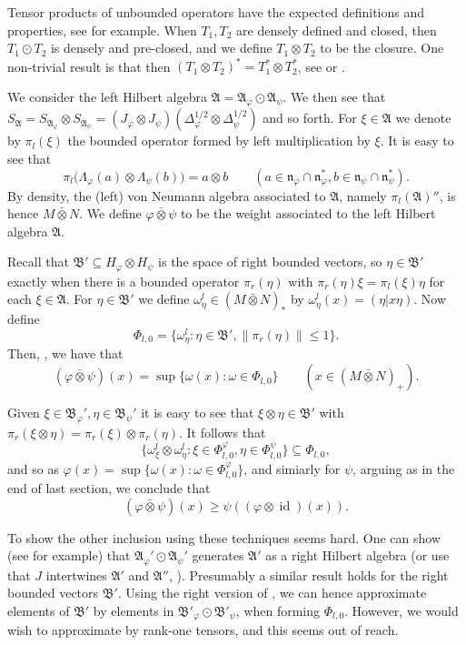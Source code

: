 \documentclass[a4paper,11pt]{article}
\theoremstyle{plain}
\theoremstyle{remark}
\newcommand{\mf}[1]{\mathfrak{#1}}
\newcommand{\id}{\operatorname{id}}
\newcommand{\vnten}{\bar\otimes}
\begin{document}
Tensor products of unbounded operators have the expected definitions and properties, see \cite[Section~7.5]{Schmudgen_UnboundedBook} for example.  When $T_1,T_2$ are densely defined and closed, then $T_1\odot T_2$ is densely and pre-closed, and we define $T_1\otimes T_2$ to be the closure.  One non-trivial result is that then $(T_1\otimes T_2)^* = T_1^*\otimes T_2^*$, see \cite[Proposition~7.26]{Schmudgen_UnboundedBook} or \cite[Lemma~VIII.4.1]{TakesakiII}.

We consider the left Hilbert algebra $\mf A = \mf A_\varphi \odot \mf A_\psi$.  We then see that $S_{\mf A} = S_{\mf A_\varphi} \otimes S_{\mf A_\psi} = (J_\varphi\otimes J_\psi) (\Delta_\varphi^{1/2} \otimes \Delta_\psi^{1/2})$ and so forth.  For $\xi\in\mf A$ we denote by $\pi_l(\xi)$ the bounded operator formed by left multiplication by $\xi$.  It is easy to see that
\[ \pi_l\big( \Lambda_\varphi(a) \otimes \Lambda_\psi(b) \big) = a\otimes b \qquad
(a\in\mf n_\varphi \cap \mf n_\varphi^*, b\in\mf n_\psi \cap \mf n_\psi^*). \]
By density, the (left) von Neumann algebra associated to $\mf A$, namely $\pi_l(\mf A)''$, is hence $M\vnten N$.  We define $\varphi\vnten\psi$ to be the weight associated to the left Hilbert algebra $\mf A$.

Recall that $\mf B' \subseteq H_\varphi \otimes H_\psi$ is the space of right bounded vectors, so $\eta\in\mf B'$ exactly when there is a bounded operator $\pi_r(\eta)$ with $\pi_r(\eta)\xi = \pi_l(\xi)\eta$ for each $\xi\in \mf A$.  For $\eta\in\mf B'$ we define $\omega^l_\eta \in (M\vnten N)_*$ by $\omega^l_\eta(x) = (\eta|x\eta)$.  Now define
\[ \Phi_{l,0} = \big\{ \omega^l_\eta : \eta\in\mf B', \|\pi_r(\eta)\|\leq 1 \big\}. \]
Then, \cite[Lemma~VII.2.4]{TakesakiII}, we have that
\[ (\varphi\vnten\psi)(x) = \sup\{ \omega(x) : \omega\in \Phi_{l,0} \} \qquad (x\in (M\vnten N)_+). \]

Given $\xi\in\mf B_\varphi', \eta\in\mf B_\psi'$ it is easy to see that $\xi\otimes\eta\in \mf B'$ with $\pi_r(\xi\otimes\eta) = \pi_r(\xi)\otimes\pi_r(\eta)$.  It follows that
\[ \{ \omega^l_\xi \otimes \omega^l_\eta : \xi\in \Phi^\varphi_{l,0}, \eta\in\Phi^\psi_{l,0} \} \subseteq \Phi_{l,0}, \]
and so as $\varphi(x) = \sup\{ \omega(x) : \omega\in \Phi^\varphi_{l,0}\}$, and simiarly for $\psi$, arguing as in the end of last section, we conclude that
\[ (\varphi\vnten\psi)(x) \geq \psi((\varphi\otimes\id)(x)). \]

To show the other inclusion using these techniques seems hard.  One can show (see \cite[(7), Section~8]{Stratila_ModTheoryBook} for example) that $\mf A_\varphi' \odot \mf A_\psi'$ generates $\mf A'$ as a right Hilbert algebra (or use that $J$ intertwines $\mf A'$ and $\mf A''$, \cite[Theorem~VI.1.19(ii)]{TakesakiII}).  Presumably a similar result holds for the right bounded vectors $\mf B'$.  Using the right version of \cite[Theorem~VI.1.26(ii)]{TakesakiII}, we can hence approximate elements of $\mf B'$ by elements in $\mf B'_\varphi \odot \mf B'_\psi$, when forming $\Phi_{l,0}$.  However, we would wish to approximate by rank-one tensors, and this seems out of reach.
\end{document}
